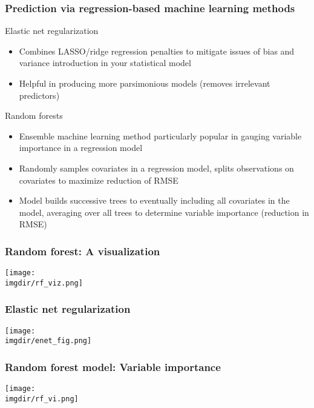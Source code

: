 \documentclass[aspectratio=169, t, 10pt]{beamer}
\begin{document}
\begin{frame}
  \frametitle{Prediction via regression-based machine learning methods}
  \begin{block}{Elastic net regularization}\citep{zouhastie_2005}
    \begin{itemize}
    \item Combines LASSO/ridge regression penalties to mitigate issues
      of bias and variance introduction in your statistical model
    \item Helpful in producing more parsimonious models (removes
      irrelevant predictors)
    \end{itemize}
  \end{block}
  \begin{block}{Random forests}
    \begin{itemize}
      \item Ensemble machine learning method particularly popular in
        gauging variable importance in a regression model
      \item Randomly samples covariates in a regression model, splits
        observations on covariates to maximize reduction of RMSE 
      \item Model builds successive trees to eventually including all
        covariates in the model, averaging over all trees to determine
        variable importance (reduction in RMSE)
      \end{itemize}
   \end{block}
\end{frame}
      
      
\begin{frame}
  \frametitle{Random forest: A visualization}\citep{koehrsen_2018}
    \centering
        \texttt{[image: \\imgdir/rf\_viz.png]}
 \end{frame}

\begin{frame}
  \frametitle{Elastic net regularization}
    \centering
        \texttt{[image: \\imgdir/enet\_fig.png]}
 \end{frame}

\begin{frame}
  \frametitle{Random forest model: Variable importance}
    \centering
        \texttt{[image: \\imgdir/rf\_vi.png]}
 \end{frame}
\end{document}
